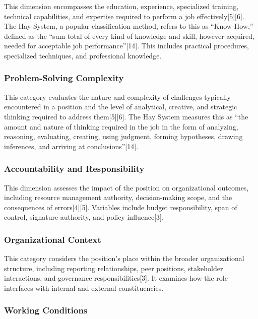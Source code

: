 \documentclass[
  letterpaper,
  DIV=11,
  numbers=noendperiod]{scrartcl}
\begin{document}
This dimension encompasses the education, experience, specialized
training, technical capabilities, and expertise required to perform a
job effectively{[}5{]}{[}6{]}. The Hay System, a popular classification
method, refers to this as ``Know-How,'' defined as the ``sum total of
every kind of knowledge and skill, however acquired, needed for
acceptable job performance''{[}14{]}. This includes practical
procedures, specialized techniques, and professional knowledge.

\subsubsection{Problem-Solving
Complexity}\label{problem-solving-complexity}

This category evaluates the nature and complexity of challenges
typically encountered in a position and the level of analytical,
creative, and strategic thinking required to address them{[}5{]}{[}6{]}.
The Hay System measures this as ``the amount and nature of thinking
required in the job in the form of analyzing, reasoning, evaluating,
creating, using judgment, forming hypotheses, drawing inferences, and
arriving at conclusions''{[}14{]}.

\subsubsection{Accountability and
Responsibility}\label{accountability-and-responsibility}

This dimension assesses the impact of the position on organizational
outcomes, including resource management authority, decision-making
scope, and the consequences of errors{[}4{]}{[}5{]}. Variables include
budget responsibility, span of control, signature authority, and policy
influence{[}3{]}.

\subsubsection{Organizational Context}\label{organizational-context}

This category considers the position's place within the broader
organizational structure, including reporting relationships, peer
positions, stakeholder interactions, and governance
responsibilities{[}3{]}. It examines how the role interfaces with
internal and external constituencies.

\subsubsection{Working Conditions}\label{working-conditions}
\end{document}
